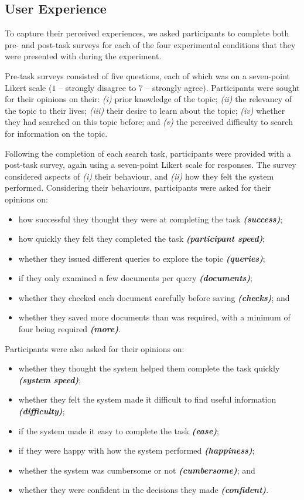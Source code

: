 \subsection{User Experience}\label{sec:method:experience}
To capture their perceived experiences, we asked participants to complete both pre- and post-task surveys for each of the four experimental conditions that they were presented with during the experiment.

Pre-task surveys consisted of five questions, each of which was on a seven-point Likert scale ($1$ -- strongly disagree to $7$ -- strongly agree). Participants were sought for their opinions on their: \emph{(i)} prior knowledge of the topic; \emph{(ii)} the relevancy of the topic to their lives; \emph{(iii)} their desire to learn about the topic; \emph{(iv)} whether they had searched on this topic before; and \emph{(v)} the perceived difficulty to search for information on the topic.

Following the completion of each search task, participants were provided with a post-task survey, again using a seven-point Likert scale for responses. The survey considered aspects of \emph{(i)} their behaviour, and \emph{(ii)} how they felt the system performed. Considering their behaviours, participants were asked for their opinions on:

\begin{itemize}
\item how successful they thought they were at completing the task \emph{\textbf{(success)}}; 
\item how quickly they felt they completed the task \emph{\textbf{(participant speed)}}; 
\item whether they issued different queries to explore the topic \emph{\textbf{(queries)}}; 
\item if they only examined a few documents per query \emph{\textbf{(documents)}}; 
\item whether they checked each document carefully before saving \emph{\textbf{(checks)}}; and 
\item whether they saved more documents than was required, with a minimum of four being required \emph{\textbf{(more)}}. 
\end{itemize}
Participants were also asked for their opinions on: 
\begin{itemize}
\item whether they thought the system helped them complete the task quickly \emph{\textbf{(system speed)}}; 
\item whether they felt the system made it difficult to find useful information \emph{\textbf{(difficulty)}}; 
\item if the system made it easy to complete the task \emph{\textbf{(ease)}}; 
\item if they were happy with how the system performed \emph{\textbf{(happiness)}}; 
\item whether the system was cumbersome or not \emph{\textbf{(cumbersome)}}; and 
\item whether they were confident in the decisions they made \emph{\textbf{(confident)}}. 
\end{itemize}

